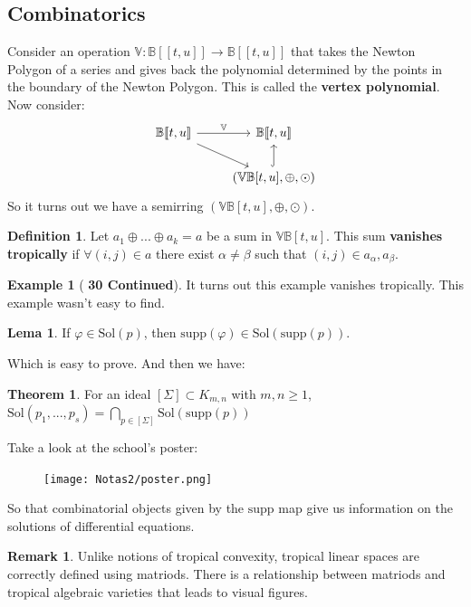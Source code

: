 \documentclass{article}
\theoremstyle{definition}
\newtheorem*{lema}{Lema}
\newtheorem*{obs}{Remark}
\newtheorem{thm}{Theorem}
\newtheorem*{defn}{Definition}
\newtheorem*{ex*}{Example}
\newcommand{\supp}{\text{supp}}
\newcommand{\Sol}{\text{Sol}}
\begin{document}
\subsection{Combinatorics}
Consider an operation $\mathbb V:\mathbb B[\![t,u]\!]\to\mathbb B[\![t,u]\!]$ that takes the Newton Polygon of a series and gives back the polynomial determined by the points in the boundary of the Newton Polygon. This is called the \textbf{vertex polynomial}. Now consider:
$$\begin{tikzcd}
\mathbb B[\![ t,u]\!] \arrow{r}[above]{\mathbb V}\arrow{dr} & \mathbb B[\![ t,u]\!] \\
&(\mathbb{VB}[t,u],\oplus,\odot)\arrow[hookrightarrow]{u} 
\end{tikzcd}$$
So it turns out we have a semirring $(\mathbb{VB}[t,u],\oplus,\odot)$.
\begin{defn}
    Let $a_1\oplus...\oplus a_k=a$ be a sum in $\mathbb{VB}[t,u]$. This sum \textbf{vanishes tropically} if $\forall(i,j)\in a$ there exist $\alpha\neq\beta$ such that $(i,j)\in a_\alpha,a_\beta$.
\end{defn}
\begin{ex*}[\textbf{ 30 Continued}]
    It turns out this example vanishes tropically. This example wasn't easy to find.
\end{ex*}
\begin{lema}
    If $\varphi\in\Sol(p)$, then $\supp(\varphi)\in\Sol(\supp(p))$.
\end{lema}
Which is easy to prove. And then we have:
\begin{thm}
    For an ideal $[\Sigma]\subset K_{m,n}$ with $m,n\geq1$, $\Sol(p_1,...,p_s)=\bigcap_{p\in[\Sigma]}\Sol(\supp(p))$
\end{thm}
Take a look at the school's poster:\par
\begin{figure}[H]\centering\texttt{[image: Notas2/poster.png]}\end{figure}
So that combinatorial objects given by the $\supp$ map give us information on the solutions of differential equations.
\begin{obs}
    Unlike notions of tropical convexity, tropical linear spaces are correctly defined using matriods. There is a relationship between matriods and tropical algebraic varieties that leads to visual figures.
\end{obs}
\end{document}
